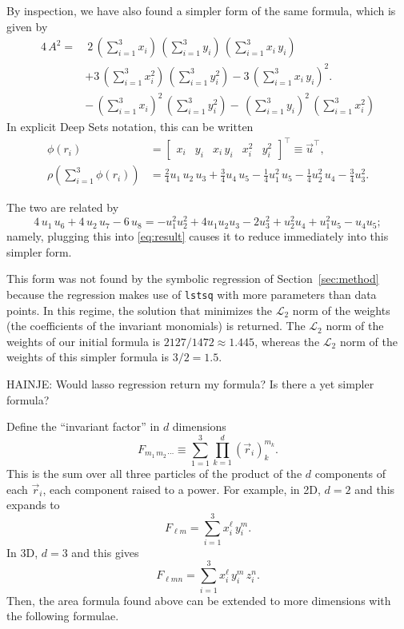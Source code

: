 \documentclass[12pt]{article}
\newcommand{\sectionname}{Section}
\newcommand{\secref}[1]{\sectionname~\ref{#1}}
\begin{document}
\newpage
By inspection, we have also found a simpler form of the same formula, which is given by
\begin{align}
    4 \, A^2 = & \
        2 \, (\sum_{i=1}^{3} x_i ) \, (\sum_{i=1}^{3} y_i ) \, (\sum_{i=1}^{3} x_i \, y_i )
        \nonumber \\ &
        + 3 \, (\sum_{i=1}^{3} x_i^2 ) \, (\sum_{i=1}^{3} y_i^2 )
        - 3 \, (\sum_{i=1}^{3} x_i \, y_i )^2.
        \nonumber \\ &
        - \, (\sum_{i=1}^{3} x_i )^2 \, (\sum_{i=1}^{3} y_i^2 )
        - \, (\sum_{i=1}^{3} y_i )^2 \, (\sum_{i=1}^{3} x_i^2 )
\end{align}
In explicit Deep Sets notation, this can be written
\begin{align}
    \phi(r_i) &= \begin{bmatrix}
        x_i & y_i & x_i\,y_i & x_i^2 & y_i^2 \end{bmatrix}^\top
        \equiv \vec{u}^\top, \\
    \rho(\sum_{i=1}^{3} \phi(r_i))
    &= \tfrac{2}{4} u_1\,u_2\,u_3
    + \tfrac{3}{4} u_4\,u_5
    - \tfrac{1}{4} u_1^2\,u_5
    - \tfrac{1}{4} u_2^2\,u_4
    - \tfrac{3}{4} u_3^2.
\end{align}

The two are related by
\begin{equation}
    4\,u_1\,u_6 + 4\,u_2\,u_7 - 6\,u_8 = 
    -u_1^2 u_2^2 + 4 u_1 u_2 u_3 - 2 u_3^2 + u_2^2 u_4 + u_1^2 u_5 - u_4 u_5 ;
\end{equation}
namely, plugging this into \eqref{eq:result} causes it to reduce immediately into this simpler form.

This form was not found by the symbolic regression of \secref{sec:method} because the regression makes use of \verb+lstsq+ with more parameters than data points. In this regime, the solution that minimizes the $\mathcal{L}_2$ norm of the weights (the coefficients of the invariant monomials) is returned. The $\mathcal{L}_2$ norm of the weights of our initial formula is $2127 / 1472 \approx 1.445$, whereas the $\mathcal{L}_2$ norm of the weights of this simpler formula is $3/2 = 1.5$.

HAINJE: Would lasso regression return my formula? Is there a yet simpler formula?

\newpage

Define the ``invariant factor'' in $d$ dimensions
\begin{equation}
    F_{m_1 \, m_2 \, \cdots} \equiv \sum_{1=1}^{3} \prod_{k=1}^{d} (\vec{r}_{i})_{k}^{m_k}.
\end{equation}
This is the sum over all three particles of the product of the $d$ components of each $\vec{r}_i$, each component raised to a power. For example, in 2D, $d=2$ and this expands to
\begin{equation}
    F_{\ell m} = \sum_{i=1}^{3} x_i^\ell \, y_i^m.
\end{equation}
In 3D, $d=3$ and this gives
\begin{equation}
    F_{\ell m n} = \sum_{i=1}^{3} x_i^\ell \, y_i^m \, z_i^n.
\end{equation}
Then, the area formula found above can be extended to more dimensions with the following formulae.
\end{document}
